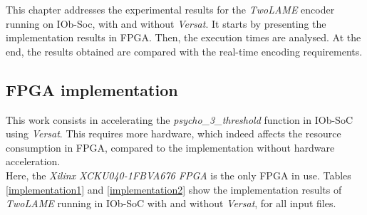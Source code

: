 



This chapter addresses the experimental results for the \textit{TwoLAME} encoder running on IOb-Soc, with and without \textit{Versat}.
It starts by presenting the implementation results in FPGA. Then, the execution times are analysed. At the end, the results obtained are compared with the real-time encoding requirements.

\subsection{FPGA implementation}
This work consists in accelerating the \textit{psycho\_3\_threshold} function in IOb-SoC using \textit{Versat}. This requires more hardware, which indeed affects the resource consumption in FPGA, compared to the implementation without hardware acceleration.\\
Here, the \textit{Xilinx XCKU040-1FBVA676 FPGA} is the only FPGA in use. Tables \ref{implementation1} and \ref{implementation2} show the implementation results of \textit{TwoLAME} running in IOb-SoC with and without \textit{Versat}, for all input files.

